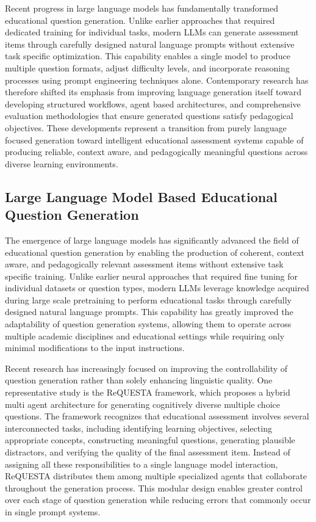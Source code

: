 Recent progress in large language models has fundamentally transformed educational question generation. Unlike earlier approaches that required dedicated training for individual tasks, modern LLMs can generate assessment items through carefully designed natural language prompts without extensive task specific optimization. This capability enables a single model to produce multiple question formats, adjust difficulty levels, and incorporate reasoning processes using prompt engineering techniques alone. Contemporary research has therefore shifted its emphasis from improving language generation itself toward developing structured workflows, agent based architectures, and comprehensive evaluation methodologies that ensure generated questions satisfy pedagogical objectives. These developments represent a transition from purely language focused generation toward intelligent educational assessment systems capable of producing reliable, context aware, and pedagogically meaningful questions across diverse learning environments. \cite{eqgbench2025,requesta2026}

\subsection{Large Language Model Based Educational Question Generation}
\label{sec:lit-llm}

The emergence of large language models has significantly advanced the field of educational question generation by enabling the production of coherent, context aware, and pedagogically relevant assessment items without extensive task specific training. Unlike earlier neural approaches that required fine tuning for individual datasets or question types, modern LLMs leverage knowledge acquired during large scale pretraining to perform educational tasks through carefully designed natural language prompts. This capability has greatly improved the adaptability of question generation systems, allowing them to operate across multiple academic disciplines and educational settings while requiring only minimal modifications to the input instructions.

Recent research has increasingly focused on improving the controllability of question generation rather than solely enhancing linguistic quality. One representative study is the ReQUESTA framework, which proposes a hybrid multi agent architecture for generating cognitively diverse multiple choice questions. The framework recognizes that educational assessment involves several interconnected tasks, including identifying learning objectives, selecting appropriate concepts, constructing meaningful questions, generating plausible distractors, and verifying the quality of the final assessment item. Instead of assigning all these responsibilities to a single language model interaction, ReQUESTA distributes them among multiple specialized agents that collaborate throughout the generation process. This modular design enables greater control over each stage of question generation while reducing errors that commonly occur in single prompt systems. \cite{requesta2026}

